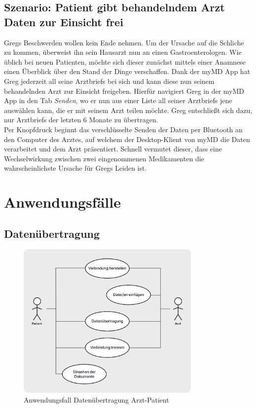 \documentclass[a4paper]{scrreprt}
\begin{document}
\subsection{Szenario: Patient gibt behandelndem Arzt Daten zur Einsicht frei}
Gregs Beschwerden wollen kein Ende nehmen. Um der Ursache auf die Schliche zu kommen, überweist ihn sein Hausarzt nun an einen Gastroenterologen. Wie üblich bei neuen Patienten, möchte sich dieser zunächst mittels einer \gls{Anamnese} einen Überblick über den Stand der Dinge verschaffen. Dank der myMD \gls{App} hat Greg jederzeit all seine \glspl{Arztbrief} bei sich und kann diese nun seinem behandelnden Arzt zur Einsicht freigeben. Hierfür navigiert Greg in der myMD App in den \gls{Tab} \textit{Senden}, wo er nun aus einer Liste all seiner \glspl{Arztbrief} jene auswählen kann, die er mit seinem Arzt teilen möchte. Greg entschließt sich dazu, nur \glspl{Arztbrief} der letzten 6 Monate zu übertragen. \\
Per Knopfdruck beginnt das verschlüsselte Senden der Daten per \gls{Bluetooth} an den Computer des Arztes, auf welchem der Desktop-Klient von myMD die Daten verarbeitet und dem Arzt präsentiert. Schnell vermutet dieser, dass eine Wechselwirkung zwischen zwei eingenommenen \gls{Medikament}en die wahrscheinlichste Ursache für Gregs Leiden ist.

\section{Anwendungsfälle}
\subsection{Datenübertragung}
\begin{figure}[H]
\centering
\includegraphics[width=0.8\textwidth]{graphics/AF-ArztPatient}
\caption{Anwendungsfall Datenübertragung Arzt-Patient}
\end{figure}
\end{document}
